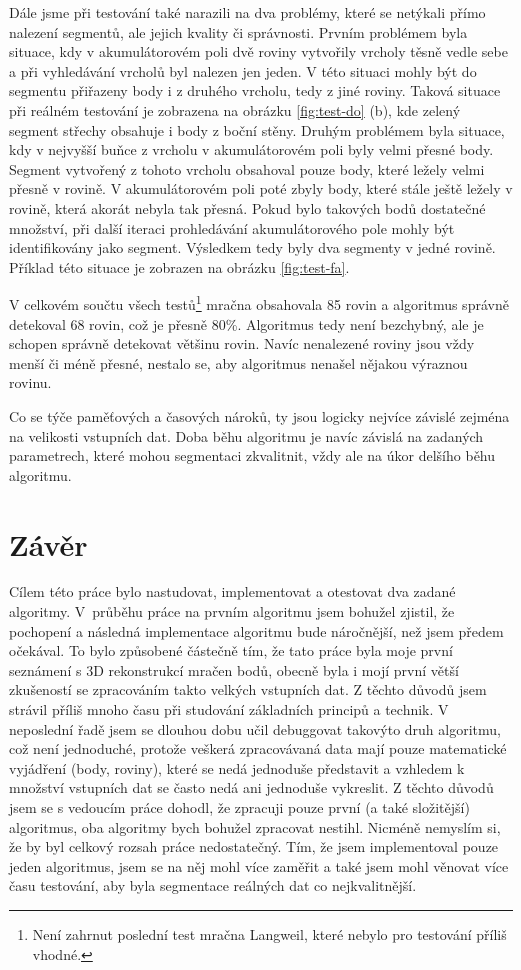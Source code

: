 \documentclass[11pt,twoside,a4paper]{book}
\begin{document}
Dále jsme při testování také narazili na dva problémy, které se netýkali přímo nalezení segmentů, ale jejich kvality či správnosti. Prvním problémem byla situace, kdy v akumulátorovém poli dvě roviny vytvořily vrcholy těsně vedle sebe a při vyhledávání vrcholů byl nalezen jen jeden. V této situaci mohly být do segmentu přiřazeny body i z druhého vrcholu, tedy z jiné roviny. Taková situace při reálném testování je zobrazena na obrázku \ref{fig:test-do} (b), kde zelený segment střechy obsahuje i body z boční stěny. Druhým problémem byla situace, kdy v nejvyšší buňce z vrcholu v akumulátorovém poli byly velmi přesné body. Segment vytvořený z tohoto vrcholu obsahoval pouze body, které ležely velmi přesně v rovině. V akumulátorovém poli poté zbyly body, které stále ještě ležely v rovině, která akorát nebyla tak přesná. Pokud bylo takových bodů dostatečné množství, při další iteraci prohledávání akumulátorového pole mohly být identifikovány jako segment. Výsledkem tedy byly dva segmenty v jedné rovině. Příklad této situace je zobrazen na obrázku \ref{fig:test-fa}.

V celkovém součtu všech testů\footnote{Není zahrnut poslední test mračna Langweil, které nebylo pro testování příliš vhodné.} mračna obsahovala 85 rovin a algoritmus správně detekoval 68 rovin, což je přesně 80\%. Algoritmus tedy není bezchybný, ale je schopen správně detekovat většinu rovin. Navíc nenalezené roviny jsou vždy menší či méně přesné, nestalo se, aby algoritmus nenašel nějakou výraznou rovinu.

Co se týče paměťových a časových nároků, ty jsou logicky nejvíce závislé zejména na velikosti vstupních dat. Doba běhu algoritmu je navíc závislá na zadaných parametrech, které mohou segmentaci zkvalitnit, vždy ale na úkor delšího běhu algoritmu.


\chapter{Závěr}

Cílem této práce bylo nastudovat, implementovat a otestovat dva zadané algoritmy. V~průběhu práce na prvním algoritmu jsem bohužel zjistil, že pochopení a následná implementace algoritmu bude náročnější, než jsem předem očekával. To bylo způsobené částečně tím, že tato práce byla moje první seznámení s 3D rekonstrukcí mračen bodů, obecně byla i mojí první větší zkušeností se zpracováním takto velkých vstupních dat. Z těchto důvodů jsem strávil příliš mnoho času při studování základních principů a technik. V neposlední řadě jsem se dlouhou dobu učil debuggovat takovýto druh algoritmu, což není jednoduché, protože veškerá zpracovávaná data mají pouze matematické vyjádření (body, roviny), které se nedá jednoduše představit a vzhledem k množství vstupních dat se často nedá ani jednoduše vykreslit. Z těchto důvodů jsem se s vedoucím práce dohodl, že zpracuji pouze první (a také složitější) algoritmus, oba algoritmy bych bohužel zpracovat nestihl. Nicméně nemyslím si, že by byl celkový rozsah práce nedostatečný. Tím, že jsem implementoval pouze jeden algoritmus, jsem se na něj mohl více zaměřit a také jsem mohl věnovat více času testování, aby byla segmentace reálných dat co nejkvalitnější.
\end{document}

